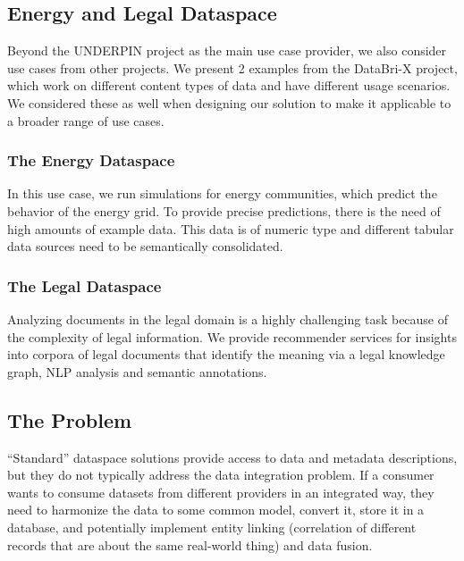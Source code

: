 \documentclass[
  super,
  preprint,
  3p]{elsarticle}
\begin{document}
\subsection{Energy and Legal
Dataspace}\label{energy-and-legal-dataspace}

Beyond the UNDERPIN project as the main use case provider, we also
consider use cases from other projects. We present 2 examples from the
DataBri-X project, which work on different content types of data and
have different usage scenarios. We considered these as well when
designing our solution to make it applicable to a broader range of use
cases.

\subsubsection{The Energy Dataspace}\label{the-energy-dataspace}

In this use case, we run simulations for energy communities, which
predict the behavior of the energy grid. To provide precise predictions,
there is the need of high amounts of example data. This data is of
numeric type and different tabular data sources need to be semantically
consolidated.

\subsubsection{The Legal Dataspace}\label{the-legal-dataspace}

Analyzing documents in the legal domain is a highly challenging task
because of the complexity of legal information. We provide recommender
services for insights into corpora of legal documents that identify the
meaning via a legal knowledge graph, NLP analysis and semantic
annotations.

\subsection{The Problem}\label{the-problem}

``Standard'' dataspace solutions provide access to data and metadata
descriptions, but they do not typically address the data integration
problem. If a consumer wants to consume datasets from different
providers in an integrated way, they need to harmonize the data to some
common model, convert it, store it in a database, and potentially
implement entity linking (correlation of different records that are
about the same real-world thing) and data fusion.
\end{document}
